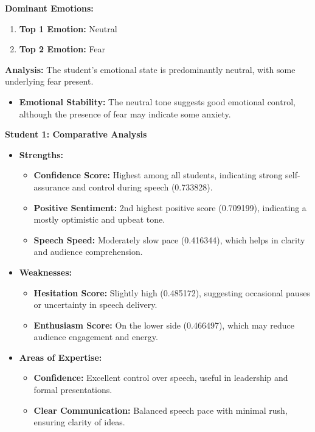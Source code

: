 \documentclass{article}
\begin{document}
    \vspace{0.1in}
    \large{\textbf{Dominant Emotions:}}
    \begin{tcolorbox}[colback=pink!10!white, colframe=pink!80!black, title=Emotional State]
        \begin{enumerate}
            \item \textbf{Top 1 Emotion:} \textcolor{blue!80!black}{Neutral}
            \item \textbf{Top 2 Emotion:} \textcolor{red!80!black}{Fear}
        \end{enumerate}
        \textbf{Analysis:} The student's emotional state is predominantly neutral, with some underlying fear present.
        \begin{itemize}
            \item \textbf{Emotional Stability:} The neutral tone suggests good emotional control, although the presence of fear may indicate some anxiety.
        \end{itemize}
    \end{tcolorbox}
    \vspace{0.3in}
\textbf{Student 1: Comparative Analysis}
\begin{itemize}
    \item \textbf{Strengths:}
    \begin{itemize}
        \item \textbf{Confidence Score:} Highest among all students, indicating strong self-assurance and control during speech (0.733828).
        \item \textbf{Positive Sentiment:} 2nd highest positive score (0.709199), indicating a mostly optimistic and upbeat tone.
        \item \textbf{Speech Speed:} Moderately slow pace (0.416344), which helps in clarity and audience comprehension.
    \end{itemize}
    \item \textbf{Weaknesses:}
    \begin{itemize}
        \item \textbf{Hesitation Score:} Slightly high (0.485172), suggesting occasional pauses or uncertainty in speech delivery.
        \item \textbf{Enthusiasm Score:} On the lower side (0.466497), which may reduce audience engagement and energy.
    \end{itemize}
    \item \textbf{Areas of Expertise:}
    \begin{itemize}
        \item \textbf{Confidence:} Excellent control over speech, useful in leadership and formal presentations.
        \item \textbf{Clear Communication:} Balanced speech pace with minimal rush, ensuring clarity of ideas.
    \end{itemize}
\end{itemize}
\end{document}

